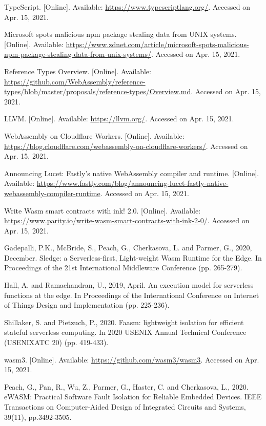 \begin{thebibliography}{00}
 TypeScript. [Online]. Available: \url{https://www.typescriptlang.org/}. Accessed on Apr. 15, 2021.

 Microsoft spots malicious npm package stealing data from UNIX systems. [Online]. Available: \url{https://www.zdnet.com/article/microsoft-spots-malicious-npm-package-stealing-data-from-unix-systems/}. Accessed on Apr. 15, 2021.

 Reference Types Overview. [Online]. Available: \url{https://github.com/WebAssembly/reference-types/blob/master/proposals/reference-types/Overview.md}. Accessed on Apr. 15, 2021.

 LLVM. [Online]. Available: \url{https://llvm.org/}. Accessed on Apr. 15, 2021.

 WebAssembly on Cloudflare Workers. [Online]. Available: \url{https://blog.cloudflare.com/webassembly-on-cloudflare-workers/}. Accessed on Apr. 15, 2021.

 Announcing Lucet: Fastly's native WebAssembly compiler and runtime. [Online]. Available: \url{https://www.fastly.com/blog/announcing-lucet-fastly-native-webassembly-compiler-runtime}. Accessed on Apr. 15, 2021.

 Write Wasm smart contracts with ink! 2.0. [Online]. Available: \url{https://www.parity.io/write-wasm-smart-contracts-with-ink-2-0/}. Accessed on Apr. 15, 2021.

 Gadepalli, P.K., McBride, S., Peach, G., Cherkasova, L. and Parmer, G., 2020, December. Sledge: a Serverless-first, Light-weight Wasm Runtime for the Edge. In Proceedings of the 21st International Middleware Conference (pp. 265-279).

 Hall, A. and Ramachandran, U., 2019, April. An execution model for serverless functions at the edge. In Proceedings of the International Conference on Internet of Things Design and Implementation (pp. 225-236).

 Shillaker, S. and Pietzuch, P., 2020. Faasm: lightweight isolation for efficient stateful serverless computing. In 2020 {USENIX} Annual Technical Conference ({USENIX}{ATC} 20) (pp. 419-433).

 wasm3. [Online]. Available: \url{https://github.com/wasm3/wasm3}. Accessed on Apr. 15, 2021.

 Peach, G., Pan, R., Wu, Z., Parmer, G., Haster, C. and Cherkasova, L., 2020. eWASM: Practical Software Fault Isolation for Reliable Embedded Devices. IEEE Transactions on Computer-Aided Design of Integrated Circuits and Systems, 39(11), pp.3492-3505.


\end{thebibliography}
